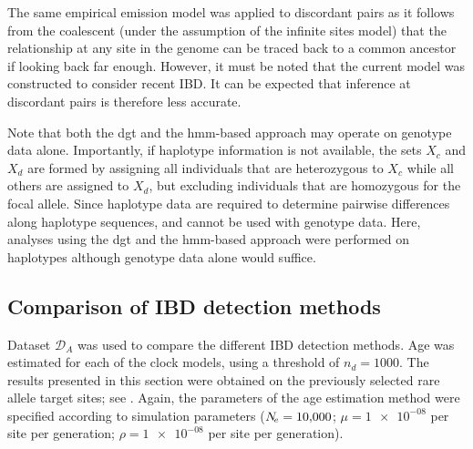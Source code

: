 The same empirical emission model was applied to discordant pairs as it follows from the coalescent (under the assumption of the infinite sites model) that the relationship at any site in the genome can be traced back to a common ancestor if looking back far enough.
However, it must be noted that the current model was constructed to consider recent IBD.
It can be expected that inference at discordant pairs is therefore less accurate.


Note that both the \gls{dgt} and the \gls{hmm}-based approach may operate on genotype data alone.
Importantly, if haplotype information is not available, the sets $X_c$ and $X_d$ are formed by assigning all individuals that are heterozygous to $X_c$ while all others are assigned to $X_d$, but excluding individuals that are homozygous for the focal allele.
Since haplotype data are required to determine pairwise differences along haplotype sequences, \ClockM and \ClockC cannot be used with genotype data.
Here, analyses using the \gls{dgt} and the \gls{hmm}-based approach were performed on haplotypes although genotype data alone would suffice.





%
\subsection{Comparison of IBD detection methods}\label{sec:compare_ibd_methods}
%

Dataset $\mathcal{D}_A$ was used to compare the different IBD detection methods.
Age was estimated for each of the  clock models, using a threshold of ${n_d=\num{1000}}$.
The results presented in this section were obtained on the previously selected  rare allele target sites; see .
Again, the parameters of the age estimation method were specified according to simulation parameters (${N_{\!e}=\num{10000}}$; ${\mu=\num[round-precision=1]{1e-08}}$ per site per generation; ${\rho=\num[round-precision=1]{1e-08}}$ per site per generation).






